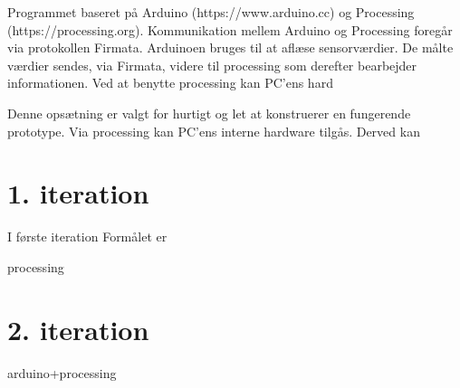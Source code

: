  Programmet baseret på Arduino (https://www.arduino.cc) og Processing (https://processing.org). Kommunikation mellem Arduino og Processing foregår via protokollen Firmata. 
 Arduinoen bruges til at aflæse sensorværdier. De målte værdier sendes, via Firmata, videre til processing som derefter bearbejder informationen.
 Ved at benytte processing kan PC'ens hard
 
 Denne opsætning er valgt for hurtigt og let at konstruerer en fungerende prototype. Via processing kan PC'ens interne hardware tilgås. Derved kan   

\section{1. iteration}
I første iteration 
 Formålet er

processing

\section{2. iteration}
arduino+processing 